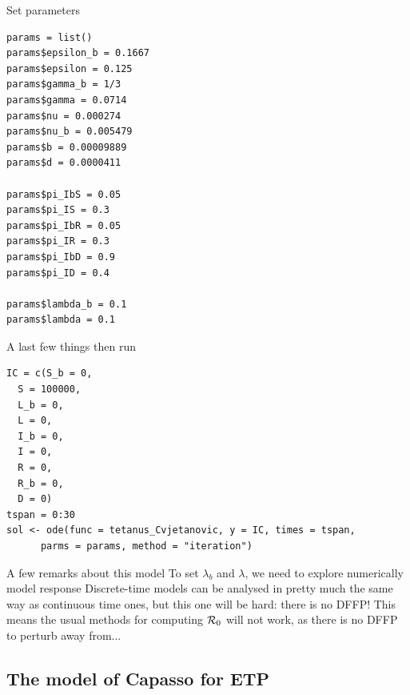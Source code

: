 \documentclass[aspectratio=169]{beamer}
\begin{document}
\begin{frame}[fragile]{Set parameters}
\begin{lstlisting}
params = list()
params$epsilon_b = 0.1667
params$epsilon = 0.125
params$gamma_b = 1/3
params$gamma = 0.0714
params$nu = 0.000274
params$nu_b = 0.005479
params$b = 0.00009889
params$d = 0.0000411

params$pi_IbS = 0.05
params$pi_IS = 0.3
params$pi_IbR = 0.05
params$pi_IR = 0.3
params$pi_IbD = 0.9
params$pi_ID = 0.4

params$lambda_b = 0.1
params$lambda = 0.1  
\end{lstlisting}
\end{frame}


\begin{frame}[fragile]{A last few things then run}
\begin{lstlisting}
IC = c(S_b = 0,
  S = 100000,
  L_b = 0,
  L = 0,
  I_b = 0,
  I = 0,
  R = 0,
  R_b = 0,
  D = 0)
tspan = 0:30 
sol <- ode(func = tetanus_Cvjetanovic, y = IC, times = tspan, 
      parms = params, method = "iteration")
\end{lstlisting}
\end{frame}


\begin{frame}{A few remarks about this model}
To set $\lambda_b$ and $\lambda$, we need to explore numerically model response
\vfill
Discrete-time models can be analysed in pretty much the same way as continuous time ones, but this one will be hard: there is no DFFP!
\vfill
This means the usual methods for computing $\mathcal{R}_0$ will not work, as there is no DFFP to perturb away from...
\end{frame}

\subsection{The model of Capasso for ETP}
\end{document}
